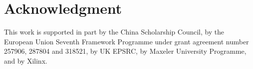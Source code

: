 \documentclass[conference]{IEEEtran}
\begin{document}


%




\section*{Acknowledgment}

This work is supported in part by the China Scholarship Council, by
the European Union Seventh Framework Programme under grant agreement
number 257906, 287804 and 318521, by UK EPSRC, by Maxeler University
Programme, and by Xilinx.


\def\IEEEbibitemsep{5pt plus .5pt}


\end{document}
